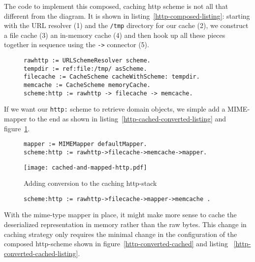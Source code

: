 \documentclass[preprint,authoryear]{llncs}
\begin{document}
The code to implement this composed, caching http scheme is not all 
that different from the diagram.  It is shown in listing~\ref{http-composed-listing}:  
starting with the URL resolver (1) and the {\tt /tmp} directory for our cache (2), we construct
a file cache (3) an in-memory cache (4) and then hook up all these pieces together
in sequence using the {\tt ->} connector (5).

\begin{figure}[htbp]
\begin{lstlisting}[style=numbers,label=http-composed-listing,caption=Code for caching http stack.]
rawhttp := URLSchemeResolver scheme.
tempdir := ref:file:/tmp/ asScheme.
filecache := CacheScheme cacheWithScheme: tempdir.
memcache := CacheScheme memoryCache.
scheme:http := rawhttp -> filecache -> memcache.
\end{lstlisting}
\end{figure}

If we want our {\tt http:} scheme to retrieve domain objects, we simple add a MIME-mapper
to the end as shown in listing~\ref{http-cached-converted-listing} and figure~\ref{http-cached-converted}.


\begin{figure}[htbp]
\begin{lstlisting}[style=L,label=http-cached-converted-listing,caption=Caching and converting.]
mapper := MIMEMapper defaultMapper.
scheme:http := rawhttp->filecache->memcache->mapper.
\end{lstlisting}
\end{figure}


\begin{figure}[htbp]
\begin{center}
\texttt{[image: cached-and-mapped-http.pdf]}
\caption{Adding conversion to the caching http-stack}
\label{http-cached-converted}
\end{center}
\end{figure}


\begin{figure}[htbp]
\begin{lstlisting}[style=L,label=http-converted-cached-listing,caption=Converting and caching.]
scheme:http := rawhttp->filecache->mapper->memcache .
\end{lstlisting}
\end{figure}


With the mime-type mapper in place, it might make more sense to
cache the deserialized representation in memory rather than
the raw bytes.  This change in caching strategy only requires
the minimal change in the configuration of the composed http-scheme
shown in figure~\ref{http-converted-cached} and listing ~\ref{http-converted-cached-listing}.
\end{document}
